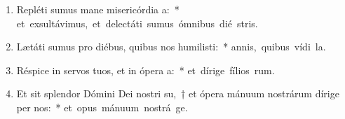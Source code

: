 \begin{flushleft}
\begin{enumerate}[leftmargin=*]
\item Repléti sumus mane misericórdia a:~* \mbox{et exsultávimus, et delectáti sumus ómnibus dié stris.}
\item Lætáti sumus pro diébus, quibus nos humilisti:~* \mbox{annis, quibus vídi la.}
\item Réspice in servos tuos, et in ópera a:~* \mbox{et dírige fílios rum.}
\item Et sit splendor Dómini Dei nostri su,~† et ópera mánuum nostrárum dírige per nos:~* \mbox{et opus mánuum nostrá ge.}


\end{enumerate}
\end{flushleft}

